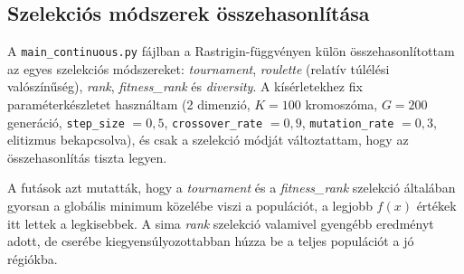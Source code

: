 \documentclass[a4paper,12pt]{article}
\begin{document}
\begin{table}[H]
  \centering
  \resizebox{\textwidth}{!}{%
  }
  \caption{A legjobb paraméterkonfigurációk a Rastrigin függvényen (2D).}
  \label{tab:rastrigin-results}
\end{table}

\subsection{Szelekciós módszerek összehasonlítása}

A \texttt{main\_continuous.py} fájlban a Rastrigin-függvényen külön
összehasonlítottam az egyes szelekciós módszereket:
\emph{tournament}, \emph{roulette} (relatív túlélési valószínűség),
\emph{rank}, \emph{fitness\_rank} és \emph{diversity}. A kísérletekhez
fix paraméterkészletet használtam (2 dimenzió, $K=100$ kromoszóma,
$G=200$ generáció, \texttt{step\_size} $=0{,}5$, \texttt{crossover\_rate}
$=0{,}9$, \texttt{mutation\_rate} $=0{,}3$, elitizmus bekapcsolva),
és csak a szelekció módját változtattam, hogy az összehasonlítás tiszta
legyen.

\begin{table}[H]
  \centering
  \caption{Szelekciós módszerek összehasonlítása a Rastrigin-függvényen (2D).}
  \label{tab:selection-compare}
\end{table}

A futások azt mutatták, hogy a \emph{tournament} és a
\emph{fitness\_rank} szelekció általában gyorsan a globális minimum
közelébe viszi a populációt, a legjobb $f(x)$ értékek itt lettek a
legkisebbek. A sima \emph{rank} szelekció valamivel gyengébb
eredményt adott, de cserébe kiegyensúlyozottabban húzza be a teljes
populációt a jó régiókba.
\end{document}
